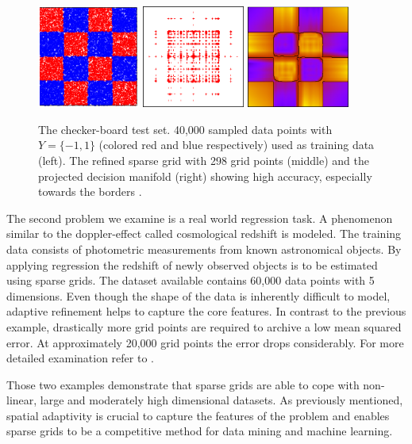 \begin{figure}[t!]
  \centering
  \includegraphics[width=0.3\textwidth]{images/figure_5_1.png}
  \hspace{10px}
  \includegraphics[width=0.3\textwidth]{images/figure_5_2.png}
  \hspace{10px}
  \includegraphics[width=0.3\textwidth]{images/figure_5_3.png}
  \captionsetup{width=0.95\textwidth}
  \caption{The checker-board test set. 40,000 sampled data points with
    $Y = \{-1, 1\}$ (colored red and blue respectively)
    used as training data (left).
    The refined sparse grid with 298 grid points (middle) and the
    projected decision manifold (right) showing high accuracy, especially
    towards the borders \cite{disspfl}.
    \label{fig:fig4}}
\end{figure}


The second problem we examine is a real world regression
task.
A phenomenon similar to the doppler-effect called cosmological redshift
is modeled. The training data consists of photometric measurements from known
astronomical objects. By applying regression the redshift of
newly observed objects is to be estimated using sparse grids.
The dataset available contains 60,000 data points with 5 dimensions. Even though
the shape of the data is inherently difficult to model, adaptive refinement
helps to capture the core features. In contrast to the previous
example, drastically more grid points are required to archive a low mean
squared error. At approximately 20,000 grid points the error drops
considerably. For more detailed examination refer to \cite{disspfl}.
\par
Those two examples demonstrate that sparse grids are able to cope with
non-linear, large and moderately high dimensional datasets. As previously
mentioned, spatial adaptivity is crucial to capture the features of the
problem and enables sparse grids to be a competitive method for data mining
and machine learning.

